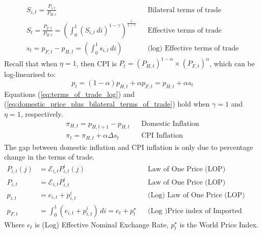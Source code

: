 \documentclass[12pt]{article}
\begin{document}
\begin{align}
    S_{i,t} = \frac{P_{i,t}}{P_{H,t}}                                                                                                     &  & \text{Bilateral terms of trade}       \\
    S_{t} =  \frac{P_{F,t}}{P_{H,t}} = \left(\int_{0}^{1} (S_{i,t} \, di)^{1-\gamma}\right)^{\frac{1}{1-\gamma}}                          &  & \text{Effective terms of trade}       \\
    s_t = p_{F,t} - p_{H,t} = \left(\int_{0}^{1} s_{i,t} \, di \right)                                      \label{eq:terms_of_trade_log} &  & \text{(log) Effective terms of trade}
\end{align}
Recall that when $\eta = 1$, then CPI is $P_t = (P_{H,t})^{1-\alpha} \times (P_{F,t})^{\alpha}$, which can be log-linearised to:
\begin{equation}
    p_t = (1-\alpha)p_{H,t} + \alpha p_{F,t} = p_{H,t} + \alpha s_t \label{eq:domestic_price_plus_bilateral_terms_of_trade}
\end{equation}
Equations (\ref{eq:terms_of_trade_log}) and (\ref{eq:domestic_price_plus_bilateral_terms_of_trade}) hold when $\gamma=1$ and $\eta = 1$, respectively.
\begin{align}
    \pi_{H,t} = p_{H,t+1} - p_{H,t}         &  & \text{Domestic Inflation} \\
    \pi_{t} = \pi_{H,t} + \alpha \Delta s_t &  & \text{CPI Inflation}
\end{align}
The gap between domestic inflation and CPI inflation is only due to percentage change in the terms of trade.
\begin{align}
    P_{i,t}(j) & = \mathcal{E}_{i,t}P_{i,t}^i(j)                                                                         &  & \text{Law of One Price (LOP)}              \\
    P_{i,t}    & = \mathcal{E}_{i,t}P_{i,t}^i                                                                            &  & \text{Law of One Price (LOP)}              \\
    p_{i,t}    & = e_{i,t}+p_{i,t}^i                                                                                     &  & \text{(Log) Law of One Price (LOP)}        \\
    p_{F,t}    & = \int_{0}^{1}(e_{i,t}+p_{i,t}^i) \,di = e_t + p_t^{\star} \label{eq:log_price_index_of_imported_goods} &  & \text{(Log )Price index of Imported Goods}
\end{align}
Where $e_t$ is (Log) Effective Nominal Exchange Rate, $p_t^{\star}$ is the World Price Index.
\end{document}
